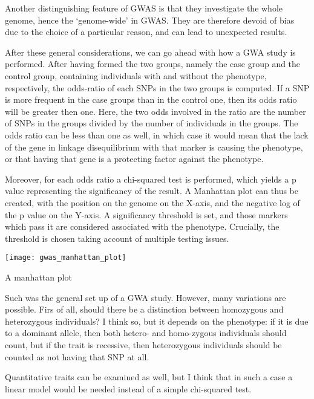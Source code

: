 \documentclass[../main.tex]{subfiles}
\begin{document}
Another distinguishing feature of GWAS is that they investigate the 
whole genome, hence the `genome-wide' in GWAS. They are therefore devoid 
of bias due to the choice of a particular reason, and can lead to 
unexpected results.


After these general considerations, we can go ahead with how a GWA study 
is performed. After having formed the two groups, namely the case group 
and the control group, containing individuals with and without the 
phenotype, respectively, the odds-ratio of each SNPs in the two groups 
is computed. If a SNP is more frequent in the case groups than in the 
control one, then its odds ratio will be greater then one. Here, the two 
odds involved in the ratio are the number of SNPs in the groups divided 
by the number of individuals in the groups. The odds ratio can be less 
than one as well, in which case it would mean that the lack of the gene 
in linkage disequilibrium with that marker is causing the phenotype, or 
that having that gene is a protecting factor against the phenotype.

Moreover, for each odds ratio a chi-squared test is performed, which 
yields a p value representing the significancy of the result. A 
Manhattan plot can thus be created, with the position on the genome on 
the X-axis, and the negative log of the p value on the Y-axis. A 
significancy threshold is set, and those markers which pass it are 
considered associated with the phenotype. Crucially, the threshold is 
chosen taking account of multiple testing issues.

\begin{marginfigure}
	\label{fig:gwas_manhattan_plot}
	\texttt{[image: gwas\_manhattan\_plot]}
	\caption{A manhattan plot}
\end{marginfigure}

Such was the general set up of a GWA study. However, many variations are 
possible. Firs of all, should there be a distinction between homozygous 
and heterozygous individuals? I think so, but it depends on the 
phenotype: if it is due to a dominant allele, then both hetero- and 
homo-zygous individuals should count, but if the trait is recessive, 
then heterozygous individuals should be counted as not having that SNP 
at all.

Quantitative traits can be examined as well, but I think that in such a 
case a linear model would be needed instead of a simple chi-squared 
test.
\end{document}

